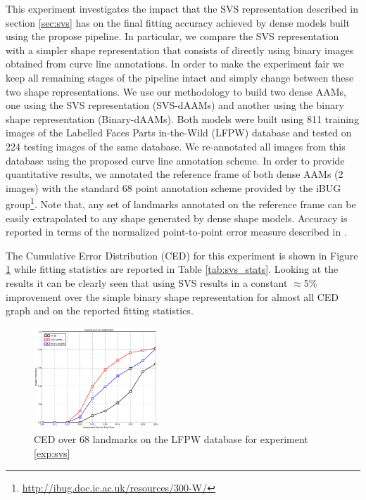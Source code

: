 This experiment investigates the impact that the SVS representation described in section \ref{sec:svs} has on the final fitting accuracy achieved by dense models built using the propose pipeline. In particular, we compare the SVS representation with a simpler shape representation that consists of directly using binary images obtained from curve line annotations. In order to make the experiment fair we keep all remaining stages of the pipeline intact and simply change between these two shape representations. We use our methodology to build two dense AAMs, one using the SVS representation (SVS-dAAMs) and another using the binary shape representation (Binary-dAAMs). Both models were built using 811 training images of the Labelled Faces Parts in-the-Wild (LFPW) \cite{Belhumeur2011} database and tested on 224 testing images of the same database. We re-annotated all images from this database using the proposed curve line annotation scheme. In order to provide quantitative results, we annotated the reference frame of both dense AAMs (2 images) with the standard 68 point annotation scheme provided by the iBUG group\footnote{\label{ibug_300} \url{http://ibug.doc.ic.ac.uk/resources/300-W/}}. Note that, any set of landmarks annotated on the reference frame can be easily extrapolated to any shape generated by dense shape models.
Accuracy is reported in terms of the normalized point-to-point error measure described in \cite{Zhu2012}.

The Cumulative Error Distribution (CED) for this experiment is shown in Figure \ref{fig:svs_ced} while fitting statistics are reported in Table \ref{tab:svs_stats}. Looking at the results it can be clearly seen that using SVS results in a constant $\approx$5\% improvement over the simple binary shape representation for almost all CED graph and on the reported fitting statistics.

\begin{figure}[t!]
\centering
\includegraphics[width=0.42\textwidth]{resources/Fig_SVS/svs_ced}
\caption{CED over 68 landmarks on the LFPW database for experiment \ref{exp:svs}}
\label{fig:svs_ced}
\end{figure}

